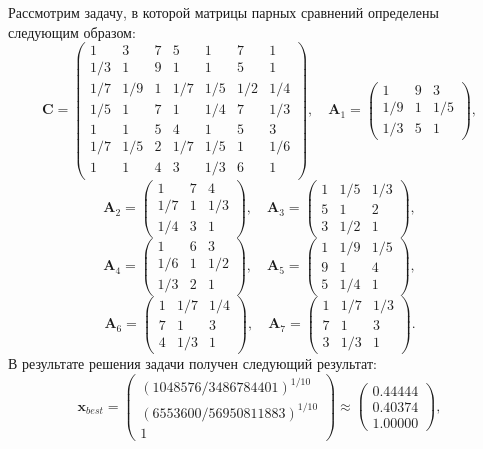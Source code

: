 \documentclass{spisok-article}
\begin{document}
    Рассмотрим задачу, в которой матрицы парных сравнений определены следующим образом: 
$$\bm{C}= \begin{pmatrix}
1 & 3 & 7 & 5 & 1 & 7 & 1\\
1/3 & 1 & 9 & 1 & 1 & 5 & 1\\
1/7 & 1/9 & 1 & 1/7 & 1/5 & 1/2 & 1/4\\
1/5 & 1 & 7 & 1 & 1/4 & 7 & 1/3\\
1 & 1 & 5 & 4 & 1 & 5 & 3\\
1/7 & 1/5 & 2 & 1/7 & 1/5 & 1 & 1/6\\
1 & 1 & 4 & 3 & 1/3 & 6 & 1
\end{pmatrix},\quad
\bm{A}_1= \begin{pmatrix}
1 & 9 & 3\\
1/9 & 1 & 1/5\\
1/3 & 5 & 1
\end{pmatrix},
$$
$$\bm{A}_2= \begin{pmatrix}
1 & 7 & 4\\
1/7 & 1 & 1/3\\
1/4 & 3 & 1
\end{pmatrix},\quad
\bm{A}_3= \begin{pmatrix}
1 & 1/5 & 1/3\\
5 & 1 & 2\\
3 & 1/2 & 1
\end{pmatrix},$$
$$
\bm{A}_4= \begin{pmatrix}
1 & 6 & 3\\
1/6 & 1 & 1/2\\
1/3 & 2 & 1
\end{pmatrix},\quad
\bm{A}_5= \begin{pmatrix}
1 & 1/9 & 1/5\\
9 & 1 & 4\\
5 & 1/4 & 1
\end{pmatrix},$$
$$
\bm{A}_6= \begin{pmatrix}
1 & 1/7 & 1/4\\
7 & 1 & 3\\
4 & 1/3 & 1
\end{pmatrix},\quad
\bm{A}_7= \begin{pmatrix}
1 & 1/7 & 1/3\\
7 & 1 & 3\\
3 & 1/3 & 1
\end{pmatrix}.
$$
В результате решения задачи получен следующий результат:
$$\bm{x}_{best} =
\begin{pmatrix}
(1048576/3486784401)^{1/10}\\
(6553600/56950811883)^{1/10}\\
1
\end{pmatrix} \approx
\begin{pmatrix}
0.44444\\
0.40374\\
1.00000
\end{pmatrix},
$$
\end{document}
